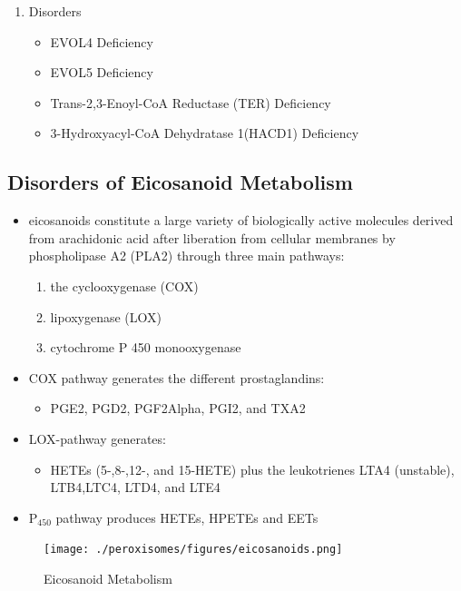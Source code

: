 \documentclass{scrartcl}
\begin{document}
\begin{enumerate}
\item Disorders
\label{sec:org36a7bdf}
\begin{itemize}
\item EVOL4 Deficiency
\item EVOL5 Deficiency
\item Trans-2,3-Enoyl-CoA Reductase (TER) Deficiency
\item 3-Hydroxyacyl-CoA Dehydratase 1(HACD1) Deficiency
\end{itemize}
\end{enumerate}

\subsection{Disorders of Eicosanoid Metabolism}
\label{sec:orgd25db90}
\begin{itemize}
\item eicosanoids constitute a large variety of biologically active
molecules derived from arachidonic acid after liberation from
cellular membranes by phospholipase A2 (PLA2) through three main pathways:
\begin{enumerate}
\item the cyclooxygenase (COX)
\item lipoxygenase (LOX)
\item cytochrome P 450 monooxygenase
\end{enumerate}

\item COX pathway generates the different prostaglandins:
\begin{itemize}
\item PGE2, PGD2, PGF2Alpha, PGI2, and TXA2
\end{itemize}

\item LOX-pathway generates:
\begin{itemize}
\item HETEs (5-,8-,12-, and 15-HETE) plus the leukotrienes LTA4
(unstable), LTB4,LTC4, LTD4, and LTE4
\end{itemize}

\item P\(_{\text{450}}\) pathway produces HETEs, HPETEs and EETs
\end{itemize}

\begin{figure}[htbp]
\centering
\texttt{[image: ./peroxisomes/figures/eicosanoids.png]}
\caption{\label{fig:orgdbee4ac}
Eicosanoid Metabolism}
\end{figure}
\end{document}
